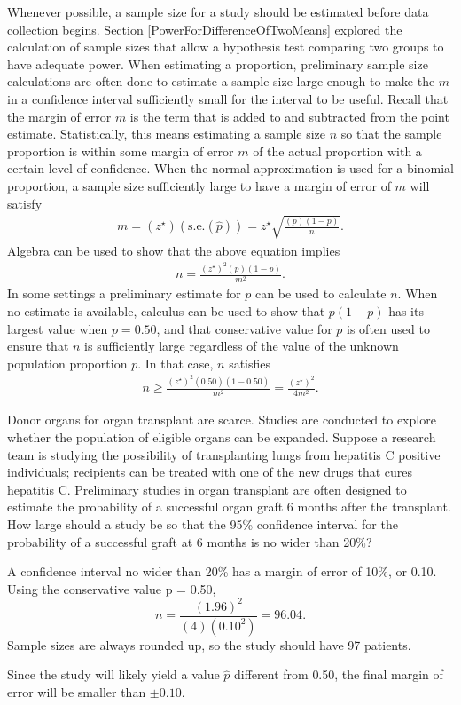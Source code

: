 Whenever possible, a sample size for a study should be estimated before data collection begins.  Section \ref{PowerForDifferenceOfTwoMeans} explored the calculation of sample sizes that allow a hypothesis test comparing two groups to have adequate power.  When estimating a proportion, preliminary sample size calculations are often done to estimate a sample size large enough to make the  $m$ in a confidence interval sufficiently small for the interval to be useful. Recall that the margin of error $m$ is the term that is added to and subtracted from the point estimate.  Statistically, this means estimating a sample size $n$ so that the sample proportion is within some margin of error $m$ of the actual proportion with a certain level of confidence. When the normal approximation is used for a binomial proportion, a sample size sufficiently large to have a margin of error of $m$ will satisfy
\begin{align*}
 m = (z^{\star})(\text{s.e.}(\hat{p})) = z^{\star} \sqrt{\frac{(p)(1 - p)}{n}}.
\end{align*}
Algebra can be used to show that the above equation implies
\begin{align*}
n = \frac{(z^{\star})^2(p)(1 - p)}{m^2}.
\end{align*}
In some settings a preliminary estimate for $p$ can be used to calculate $n$.  When no estimate is available, calculus can be used to show that $p(1 - p)$ has its largest value when $p = 0.50$, and that conservative value for $p$ is often used to ensure that $n$ is sufficiently large regardless of the value of the unknown population proportion $p$.  In  that case, $n$ satisfies
\begin{align*}
  n \geq \frac{(z^{\star})^2(0.50)(1-0.50)}{m^2} = \frac{(z^{\star})^2}{4m^2}.
\end{align*}

\textD{\newpage}

\begin{examplewrap}
\begin{nexample}{Donor organs for organ transplant are scarce. Studies are conducted to explore whether the population of eligible organs can be expanded. Suppose a research team is studying the possibility of transplanting lungs from hepatitis C positive individuals; recipients can be treated with one of the new drugs that cures hepatitis C. Preliminary studies in organ transplant are often designed to estimate the probability of a successful organ graft 6 months after the transplant.  How large should a study be so that the 95\% confidence interval for the probability of a successful graft at 6 months is no wider than 20\%?}

A confidence interval no wider than 20\% has a margin of error of 10\%, or 0.10.  Using the conservative value p = 0.50,
\[n = \frac{(1.96)^2}{(4)(0.10^2)} =  96.04.\]
Sample sizes are always rounded up, so the study should have 97 patients.

Since the study will likely yield a value $\hat{p}$ different from 0.50, the final margin of error will be smaller than $\pm 0.10$.
\end{nexample}
\end{examplewrap}

